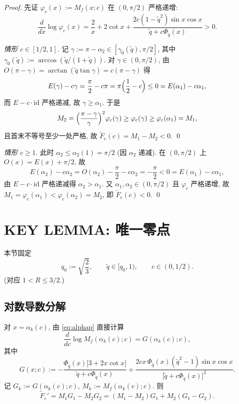 \documentclass[UTF8]{ctexart}
\begin{document}
\begin{proof}
先证 $\varphi_c(x):=M_f(x;c)$ 在 $(0,\pi/2)$ 严格递增:
\begin{equation}
	\frac{d}{dx}\log\varphi_c(x)
	=\frac2x+2\cot x+\frac{2c(1-\tilde q^2)\sin x\cos x}{\tilde q+c\Phi_{\tilde q}(x)}>0.
\end{equation}

\emph{情形 $c\in[1/2,1]$.} 记 $\gamma:=\pi-\alpha_2\in[\gamma_0(\tilde q),\pi/2]$,
其中 $\gamma_0(\tilde q):=\arccos(\tilde q/(1+\tilde q))$. 对 $\gamma\in(0,\pi/2)$,
由 $O(\pi-\gamma)=\arctan(\tilde q\tan\gamma)=c(\pi-\gamma)$ 得
\begin{equation}
	E(\gamma)-c\gamma=\frac{\pi}{2}-c\pi=\pi\Bigl(\frac12-c\Bigr)\le0
	=E(\alpha_1)-c\alpha_1,
\end{equation}
而 $E-c\cdot\mathrm{id}$ 严格递减, 故 $\gamma\ge\alpha_1$. 于是
\begin{equation}
	M_2=\Bigl(\frac{\pi-\gamma}{\gamma}\Bigr)^2\varphi_c(\gamma)
	\ge\varphi_c(\gamma)\ge\varphi_c(\alpha_1)=M_1,
\end{equation}
且首末不等号至少一处严格, 故 $\widetilde F_e(c)=M_1-M_2<0$. \qed

\emph{情形 $c\ge1$.} 此时 $\alpha_2\le\alpha_2(1)=\pi/2$ (因 $\alpha_2$ 递减).
在 $(0,\pi/2)$ 上 $O(x)=E(x)+\pi/2$, 故
\begin{equation}
	E(\alpha_2)-c\alpha_2=O(\alpha_2)-\frac{\pi}{2}-c\alpha_2=-\frac{\pi}{2}
	<0=E(\alpha_1)-c\alpha_1,
\end{equation}
由 $E-c\cdot\mathrm{id}$ 严格递减得 $\alpha_2>\alpha_1$. 又
$\alpha_1,\alpha_2\in(0,\pi/2)$ 且 $\varphi_c$ 严格递增, 故
$M_1=\varphi_c(\alpha_1)<\varphi_c(\alpha_2)=M_2$, 即 $\widetilde F_e(c)<0$. \qed
\end{proof}

\section{KEY LEMMA: 唯一零点}\label{sec:keylemma}

本节固定
\begin{equation}
	q_0:=\sqrt{\frac23},\qquad \tilde q\in[q_0,1),\qquad c\in(0,1/2).
\end{equation}
(对应 $1<R\le3/2$.)

\subsection{对数导数分解}

对 $x=\alpha_k(c)$, 由 \eqref{eq:alphap} 直接计算
\begin{equation}
	\frac{d}{dc}\log M_f(\alpha_k(c);c)=G(\alpha_k(c);c),
\end{equation}
其中
\begin{equation}
	G(x;c):=
	-\frac{\Phi_{\tilde q}(x)\bigl[3+2x\cot x\bigr]}{\tilde q+c\Phi_{\tilde q}(x)}
	+\frac{2cx\,\Phi_{\tilde q}(x)(\tilde q^2-1)\sin x\cos x}
	{\bigl[\tilde q+c\Phi_{\tilde q}(x)\bigr]^2}.
	\label{eq:G}
\end{equation}
记 $G_k:=G(\alpha_k(c);c)$, $M_k:=M_f(\alpha_k(c);c)$. 则
\begin{equation}
	\widetilde F_e'=M_1G_1-M_2G_2=(M_1-M_2)G_1+M_2(G_1-G_2).
	\label{eq:Fep}
\end{equation}
\end{document}
